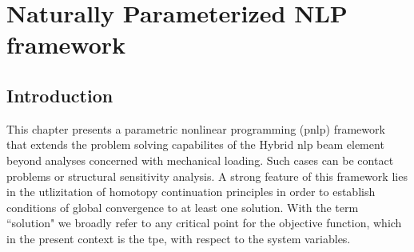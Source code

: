 \chapter{Naturally Parameterized NLP framework}

\section{Introduction}\label{CH4S1}
This chapter presents a parametric nonlinear programming (\acrshort{pnlp}) 
framework
that extends the problem solving capabilites of the Hybrid \acrshort{nlp} beam 
element beyond analyses concerned with mechanical loading. Such cases can be 
contact problems or structural sensitivity analysis. A strong feature of this 
framework lies in the utlizitation of homotopy continuation principles
in order to establish conditions of global
convergence to at least one solution. With the term ``solution" we broadly 
refer to any critical point for the objective function, which in the present 
context is the \acrshort{tpe}, with respect to the system variables. 

